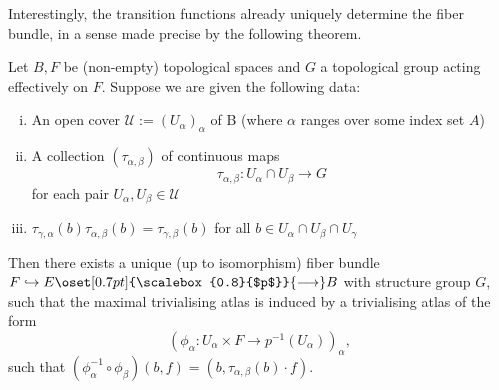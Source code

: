      Interestingly, the transition functions already uniquely determine the fiber bundle, in a sense made precise by the following theorem.

     \begin{theorem}
        \label{thm:fiber_bundle_construction1}
        Let $B,F$ be (non-empty) topological spaces and $G$ a topological group acting effectively on $F$. Suppose we are given the following data:
        \begin{enumerate}[(i)]
            \item An open cover $\mathcal{U} := (U_\alpha)_\alpha$ of B (where $\alpha$ ranges over some index set $A$)
            \item A collection $(\tau_{\alpha,\beta})$ of continuous maps
            \[
            \tau_{\alpha,\beta} \colon U_\alpha \cap U_\beta \to G
            \]
            for each pair $U_\alpha,U_\beta \in \mathcal{U}$
            \item $\tau_{\gamma,\alpha}(b)\tau_{\alpha,\beta}(b) = \tau_{\gamma,\beta}(b)$ for all $b \in U_\alpha \cap U_\beta \cap U_\gamma$
        \end{enumerate}
        Then there exists a unique (up to isomorphism) fiber bundle $F \hookrightarrow E \oset[0.7pt]{\scalebox{0.8}{$p$}}{\longrightarrow} B$ with structure group $G$, such that the maximal trivialising atlas is induced by a trivialising atlas of the form
        \[
        (\phi_\alpha \colon U_\alpha \times F \to p^{-1}(U_\alpha))_\alpha,
        \]
        such that $(\phi_\alpha^{-1} \circ \phi_\beta)(b,f) = (b,\tau_{\alpha,\beta}(b) \cdot f)$.
     \end{theorem}
